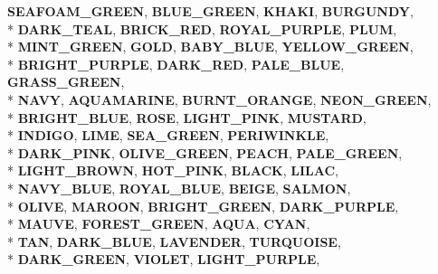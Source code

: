 \begin{DoxyCompactItemize}
{\bfseries S\+E\+A\+F\+O\+A\+M\+\_\+\+G\+R\+E\+EN}, 
{\bfseries B\+L\+U\+E\+\_\+\+G\+R\+E\+EN}, 
{\bfseries K\+H\+A\+KI}, 
{\bfseries B\+U\+R\+G\+U\+N\+DY}, 
\\*
{\bfseries D\+A\+R\+K\+\_\+\+T\+E\+AL}, 
{\bfseries B\+R\+I\+C\+K\+\_\+\+R\+ED}, 
{\bfseries R\+O\+Y\+A\+L\+\_\+\+P\+U\+R\+P\+LE}, 
{\bfseries P\+L\+UM}, 
\\*
{\bfseries M\+I\+N\+T\+\_\+\+G\+R\+E\+EN}, 
{\bfseries G\+O\+LD}, 
{\bfseries B\+A\+B\+Y\+\_\+\+B\+L\+UE}, 
{\bfseries Y\+E\+L\+L\+O\+W\+\_\+\+G\+R\+E\+EN}, 
\\*
{\bfseries B\+R\+I\+G\+H\+T\+\_\+\+P\+U\+R\+P\+LE}, 
{\bfseries D\+A\+R\+K\+\_\+\+R\+ED}, 
{\bfseries P\+A\+L\+E\+\_\+\+B\+L\+UE}, 
{\bfseries G\+R\+A\+S\+S\+\_\+\+G\+R\+E\+EN}, 
\\*
{\bfseries N\+A\+VY}, 
{\bfseries A\+Q\+U\+A\+M\+A\+R\+I\+NE}, 
{\bfseries B\+U\+R\+N\+T\+\_\+\+O\+R\+A\+N\+GE}, 
{\bfseries N\+E\+O\+N\+\_\+\+G\+R\+E\+EN}, 
\\*
{\bfseries B\+R\+I\+G\+H\+T\+\_\+\+B\+L\+UE}, 
{\bfseries R\+O\+SE}, 
{\bfseries L\+I\+G\+H\+T\+\_\+\+P\+I\+NK}, 
{\bfseries M\+U\+S\+T\+A\+RD}, 
\\*
{\bfseries I\+N\+D\+I\+GO}, 
{\bfseries L\+I\+ME}, 
{\bfseries S\+E\+A\+\_\+\+G\+R\+E\+EN}, 
{\bfseries P\+E\+R\+I\+W\+I\+N\+K\+LE}, 
\\*
{\bfseries D\+A\+R\+K\+\_\+\+P\+I\+NK}, 
{\bfseries O\+L\+I\+V\+E\+\_\+\+G\+R\+E\+EN}, 
{\bfseries P\+E\+A\+CH}, 
{\bfseries P\+A\+L\+E\+\_\+\+G\+R\+E\+EN}, 
\\*
{\bfseries L\+I\+G\+H\+T\+\_\+\+B\+R\+O\+WN}, 
{\bfseries H\+O\+T\+\_\+\+P\+I\+NK}, 
{\bfseries B\+L\+A\+CK}, 
{\bfseries L\+I\+L\+AC}, 
\\*
{\bfseries N\+A\+V\+Y\+\_\+\+B\+L\+UE}, 
{\bfseries R\+O\+Y\+A\+L\+\_\+\+B\+L\+UE}, 
{\bfseries B\+E\+I\+GE}, 
{\bfseries S\+A\+L\+M\+ON}, 
\\*
{\bfseries O\+L\+I\+VE}, 
{\bfseries M\+A\+R\+O\+ON}, 
{\bfseries B\+R\+I\+G\+H\+T\+\_\+\+G\+R\+E\+EN}, 
{\bfseries D\+A\+R\+K\+\_\+\+P\+U\+R\+P\+LE}, 
\\*
{\bfseries M\+A\+U\+VE}, 
{\bfseries F\+O\+R\+E\+S\+T\+\_\+\+G\+R\+E\+EN}, 
{\bfseries A\+Q\+UA}, 
{\bfseries C\+Y\+AN}, 
\\*
{\bfseries T\+AN}, 
{\bfseries D\+A\+R\+K\+\_\+\+B\+L\+UE}, 
{\bfseries L\+A\+V\+E\+N\+D\+ER}, 
{\bfseries T\+U\+R\+Q\+U\+O\+I\+SE}, 
\\*
{\bfseries D\+A\+R\+K\+\_\+\+G\+R\+E\+EN}, 
{\bfseries V\+I\+O\+L\+ET}, 
{\bfseries L\+I\+G\+H\+T\+\_\+\+P\+U\+R\+P\+LE}, 

\end{DoxyCompactItemize}
